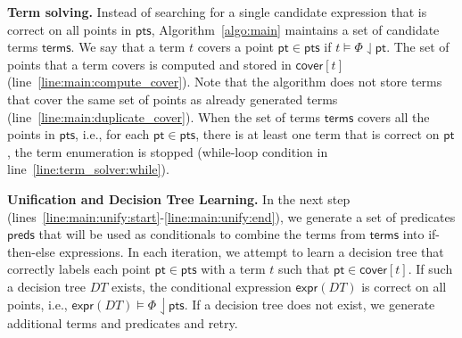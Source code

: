 \documentclass{llncs}
\newcommand\Points{\mathsf{pts}}
\newcommand\Point{\mathsf{pt}}
\newcommand\Predicates{\mathsf{preds}}
\newcommand\Terms{\mathsf{terms}}
\newcommand\Term{t}
\newcommand\Cover{\mathsf{cover}}
\newcommand\Spec{\Phi}
\newcommand\DecisionTree{\mathit{DT}}
\newcommand\DTtoExpr[1]{\mathsf{expr}(#1)}
\renewcommand{\paragraph}[1]{\par\noindent\textbf{#1.}}
\begin{document}
\paragraph{Term solving}
Instead of searching for a single candidate expression that is correct
on all points in $\Points$, Algorithm~\ref{algo:main} maintains a set of
candidate terms $\Terms$.
We say that a term $\Term$ covers a point $\Point \in \Points$ if $\Term
\models \Spec \downharpoonleft \Point$.
The set of points that a term covers is computed and stored in
$\Cover[\Term]$ (line~\ref{line:main:compute_cover}).
Note that the algorithm does not store terms that cover the same set of
points as already generated terms
(line~\ref{line:main:duplicate_cover}).
When the set of terms $\Terms$ covers all the points in $\Points$, i.e., for
each $\Point \in \Points$, there is at least one term that is correct on
$\Point$, the term enumeration is stopped (while-loop condition in
line~\ref{line:term_solver:while}).

\paragraph{Unification and Decision Tree Learning}
In the next step
(lines~\ref{line:main:unify:start}-\ref{line:main:unify:end}), we
generate a set of predicates $\Predicates$ that will be used as
conditionals to combine the terms from $\Terms$ into if-then-else
expressions.
In each iteration, we attempt to learn a decision tree that correctly
labels each point $\Point \in \Points$ with a term $\Term$ such that
$\Point \in \Cover[\Term]$.
If such a decision tree $\DecisionTree$ exists, the conditional
expression $\DTtoExpr{\DecisionTree}$ is correct on all points, i.e.,
$\DTtoExpr{\DecisionTree} \models \Spec \downharpoonleft \Points$.
If a decision tree does not exist, we generate additional terms and
predicates and retry.
\end{document}
